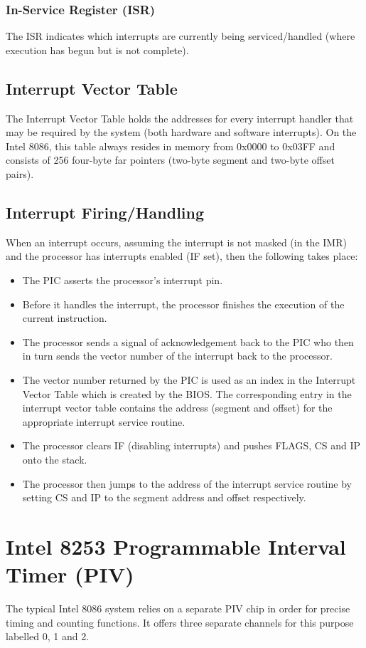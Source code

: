 		\subsubsection{In-Service Register (ISR)}
			The ISR indicates which interrupts are currently being serviced/handled (where execution has begun but is not complete).

	\subsection{Interrupt Vector Table}
		The Interrupt Vector Table holds the addresses for every interrupt handler that may be required by the system (both hardware and software interrupts). On the Intel 8086, this table always resides in memory from 0x0000 to 0x03FF and consists of 256 four-byte far pointers (two-byte segment and two-byte offset pairs).

	\subsection{Interrupt Firing/Handling}
		When an interrupt occurs, assuming the interrupt is not masked (in the IMR) and the processor has interrupts enabled (IF set), then the following takes place:
		
		\begin{itemize}
			\item The PIC asserts the processor's interrupt pin.
			\item Before it handles the interrupt, the processor finishes the execution of the current instruction.
			\item The processor sends a signal of acknowledgement back to the PIC who then in turn sends the vector number of the interrupt back to the processor.
			\item The vector number returned by the PIC is used as an index in the Interrupt Vector Table which is created by the BIOS. The corresponding entry in the interrupt vector table contains the address (segment and offset) for the appropriate interrupt service routine.
			\item The processor clears IF (disabling interrupts) and pushes FLAGS, CS and IP onto the stack.
			\item The processor then jumps to the address of the interrupt service routine by setting CS and IP to the segment address and offset respectively.
		\end{itemize}

\section{Intel 8253 Programmable Interval Timer (PIV)}
	The typical Intel 8086 system relies on a separate PIV chip in order for precise timing and counting functions. It offers three separate channels for this purpose labelled 0, 1 and 2.

